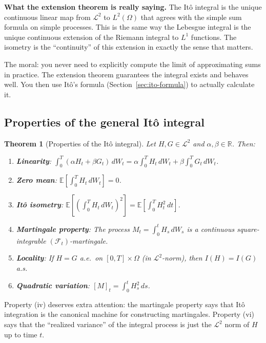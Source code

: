 \documentclass[11pt,a4paper]{article}
\theoremstyle{definition}
\theoremstyle{plain}
\newtheorem{theorem}{Theorem}[section]
\theoremstyle{remark}
\newcommand{\R}{\mathbb{R}}
\newcommand{\E}{\mathbb{E}}
\newcommand{\F}{\mathcal{F}}
\newcommand{\calL}{\mathcal{L}}
\begin{document}
\begin{tutobox}
\textbf{What the extension theorem is really saying.}
The Itô integral is the unique continuous linear map from $\calL^2$ to $L^2(\Omega)$ that agrees with the simple sum formula on simple processes. This is the same way the Lebesgue integral is the unique continuous extension of the Riemann integral to $L^1$ functions. The isometry is the ``continuity'' of this extension in exactly the sense that matters.

The moral: you never need to explicitly compute the limit of approximating sums in practice. The extension theorem guarantees the integral exists and behaves well. You then use Itô's formula (Section~\ref{sec:ito-formula}) to actually calculate it.
\end{tutobox}

\subsection{Properties of the general Itô integral}

\begin{theorem}[Properties of the Itô integral]
\label{thm:properties}
Let $H, G \in \calL^2$ and $\alpha, \beta \in \R$. Then:
\begin{enumerate}[label=(\roman*)]
  \item \textbf{Linearity}: $\int_0^T (\alpha H_t + \beta G_t)\,dW_t = \alpha\int_0^T H_t\,dW_t + \beta\int_0^T G_t\,dW_t$.
  \item \textbf{Zero mean}: $\E\left[\int_0^T H_t\,dW_t\right] = 0$.
  \item \textbf{Itô isometry}: $\E\left[\left(\int_0^T H_t\,dW_t\right)^2\right] = \E\left[\int_0^T H_t^2\,dt\right]$.
  \item \textbf{Martingale property}: The process $M_t = \int_0^t H_s\,dW_s$ is a continuous square-integrable $(\F_t)$-martingale.
  \item \textbf{Locality}: If $H = G$ a.e.\ on $[0,T]\times\Omega$ (in $\calL^2$-norm), then $I(H) = I(G)$ a.s.
  \item \textbf{Quadratic variation}: $[M]_t = \int_0^t H_s^2\,ds$.
\end{enumerate}
\end{theorem}

Property (iv) deserves extra attention: the martingale property says that Itô integration is the canonical machine for constructing martingales. Property (vi) says that the ``realized variance'' of the integral process is just the $\calL^2$ norm of $H$ up to time $t$.
\end{document}
